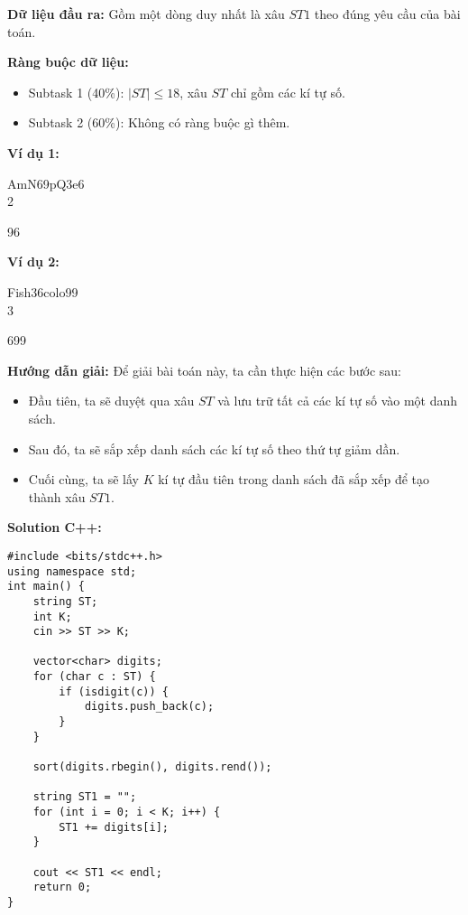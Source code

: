 \documentclass[12pt]{scrartcl}  %
\begin{document}
\textbf{Dữ liệu đầu ra:}
Gồm một dòng duy nhất là xâu $ST1$ theo đúng yêu cầu của bài toán.

\textbf{Ràng buộc dữ liệu:}
\begin{itemize}
    \item Subtask 1 (40\%): $|ST| \leq 18$, xâu $ST$ chỉ gồm các kí tự số.
    \item Subtask 2 (60\%): Không có ràng buộc gì thêm.
\end{itemize}

\textbf{Ví dụ 1:}
\begin{tcolorbox}[colback=gray!5!white, colframe=blue!50!black, title=Input]
AmN69pQ3e6\\
2
\end{tcolorbox}
\begin{tcolorbox}[colback=gray!5!white, colframe=green!50!black, title=Output]
96
\end{tcolorbox}

\textbf{Ví dụ 2:}
\begin{tcolorbox}[colback=gray!5!white, colframe=blue!50!black, title=Input]
Fish36colo99\\
3
\end{tcolorbox}
\begin{tcolorbox}[colback=gray!5!white, colframe=green!50!black, title=Output]
699
\end{tcolorbox}
\textbf{Hướng dẫn giải:}
Để giải bài toán này, ta cần thực hiện các bước sau:
\begin{itemize}
    \item Đầu tiên, ta sẽ duyệt qua xâu $ST$ và lưu trữ tất cả các kí tự số vào một danh sách.
    \item Sau đó, ta sẽ sắp xếp danh sách các kí tự số theo thứ tự giảm dần.
    \item Cuối cùng, ta sẽ lấy $K$ kí tự đầu tiên trong danh sách đã sắp xếp để tạo thành xâu $ST1$.
\end{itemize}
\textbf{Solution C++:}
\begin{lstlisting}
#include <bits/stdc++.h>
using namespace std;
int main() {
    string ST;
    int K;
    cin >> ST >> K;

    vector<char> digits;
    for (char c : ST) {
        if (isdigit(c)) {
            digits.push_back(c);
        }
    }

    sort(digits.rbegin(), digits.rend()); 

    string ST1 = "";
    for (int i = 0; i < K; i++) {
        ST1 += digits[i];
    }

    cout << ST1 << endl;
    return 0;
}
\end{lstlisting}
\end{document}
